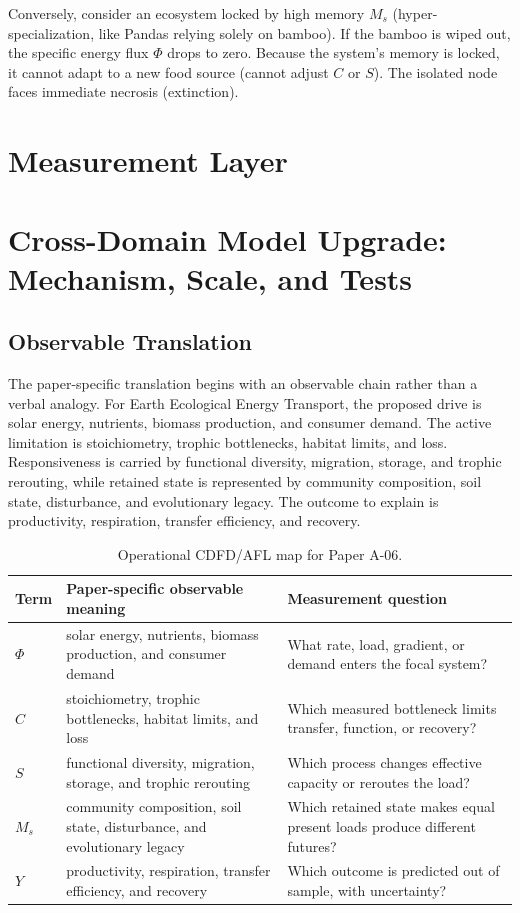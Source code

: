 \documentclass[11pt,a4paper]{article}
\begin{document}
Conversely, consider an ecosystem locked by high memory $M_s$ (hyper-specialization, like Pandas relying solely on bamboo). If the bamboo is wiped out, the specific energy flux $\Phi$ drops to zero. Because the system's memory is locked, it cannot adapt to a new food source (cannot adjust $C$ or $S$). The isolated node faces immediate necrosis (extinction).



\section{Measurement Layer}

\section{Cross-Domain Model Upgrade: Mechanism, Scale, and Tests}

\subsection{Observable Translation}

The paper-specific translation begins with an observable chain rather than a
verbal analogy. For Earth Ecological Energy Transport, the proposed drive is solar energy, nutrients, biomass production, and consumer demand.
The active limitation is stoichiometry, trophic bottlenecks, habitat limits, and loss. Responsiveness is carried by
functional diversity, migration, storage, and trophic rerouting, while retained state is represented by
community composition, soil state, disturbance, and evolutionary legacy. The outcome to explain is productivity, respiration, transfer efficiency, and recovery.

\begin{table}[htbp]
\centering
\small
\caption{Operational CDFD/AFL map for Paper A-06.}
\begin{tabularx}{\textwidth}{|l|X|X|}
\hline
\textbf{Term} & \textbf{Paper-specific observable meaning} & \textbf{Measurement question} \\
\hline
$\Phi$ & solar energy, nutrients, biomass production, and consumer demand & What rate, load, gradient, or demand enters the focal system? \\
\hline
$C$ & stoichiometry, trophic bottlenecks, habitat limits, and loss & Which measured bottleneck limits transfer, function, or recovery? \\
\hline
$S$ & functional diversity, migration, storage, and trophic rerouting & Which process changes effective capacity or reroutes the load? \\
\hline
$M_s$ & community composition, soil state, disturbance, and evolutionary legacy & Which retained state makes equal present loads produce different futures? \\
\hline
$Y$ & productivity, respiration, transfer efficiency, and recovery & Which outcome is predicted out of sample, with uncertainty? \\
\hline
\end{tabularx}
\end{table}
\end{document}
